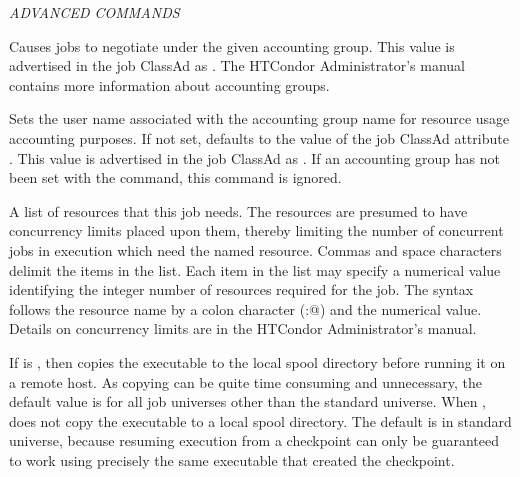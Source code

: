 \emph{ADVANCED COMMANDS}
\begin{description} 


\label{condor-submit-accounting-group}
\item[accounting\_group = $<$accounting-group-name$>$] 
Causes jobs to negotiate under the given accounting group.  
This value is advertised in the job ClassAd as .
The HTCondor Administrator's manual  contains more information about 
accounting groups.


\label{condor-submit-accounting-group-user}
\item[accounting\_group\_user = $<$accounting-group-user-name$>$] 
Sets the user name associated with the accounting group name for 
resource usage accounting purposes.  If not set, 
defaults to the value of the job ClassAd attribute .
This value is
advertised in the job ClassAd as .
If an accounting group has not been set with the 
 command, 
this command is ignored.

\label{condor-submit-concurrency-limits}
\item[concurrency\_limits = $<$string-list$>$]
A list of resources that this job needs.
The resources are presumed to have concurrency limits placed upon them,
thereby limiting the number of concurrent jobs in execution which
need the named resource.
Commas and space characters delimit the items in the list.
Each item in the list may specify a numerical value identifying the integer
number of resources required for the job.
The syntax follows the resource name by a colon character (\verb@:@)
and the numerical value.
Details on concurrency limits are in the HTCondor Administrator's manual.


\label{condor-submit-copy-to-spool}
\item[copy\_to\_spool = $<$True \Bar\ False$>$]
If  is ,
then  copies the executable to the local spool 
directory before running it on a remote host. 
As copying can be quite time consuming and unnecessary,
the default value is  for all job universes
other than the standard universe. 
When ,  does not copy the executable
to a local spool directory.
The default is  in standard universe, because
resuming execution from a checkpoint can only be guaranteed to work using
precisely the same executable that created the checkpoint.


\end{description}

